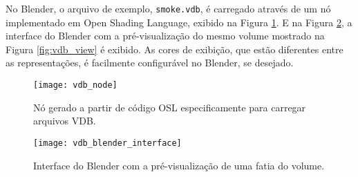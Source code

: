 No Blender, o arquivo de exemplo, \texttt{smoke.vdb}, é carregado através de um nó implementado em Open Shading Language, exibido na Figura \ref{vdb_node}. E na Figura \ref{vdb_blender_interface}, a interface do Blender com a pré-visualização do mesmo volume mostrado na Figura \ref{fig:vdb_view} é exibido. As cores de exibição, que estão diferentes entre as representações, é facilmente configurável no Blender, se desejado.
\iffalse
	Opening file: /Users/rafael/Documents/vdb_files/smoke.vdb
VDB file loaded. Volume details: 

creator: Houdini/SOP_OpenVDB_Write
Grid name: density
Grid value type: float
 class: fog volume
 file_bbox_max: [111, 223, 112]
 file_bbox_min: [1, 2, 1]
 file_mem_bytes: 6.984.656
 				10.793.640
 file_voxel_count: 1049275
 is_local_space: false
 is_saved_as_half_float: true
 name: density
 roiMax: [112, 224, 113]
 roiMin: [0, 0, 0]
 value_type: float
 vector_type: invariant
\fi
\begin{figure}[!htb]
\center
\texttt{[image: vdb\_node]}
\caption{Nó gerado a partir de código OSL especificamente para carregar arquivos VDB.}
\label{vdb_node}
\end{figure}

\begin{figure}[!htb]
\center
\texttt{[image: vdb\_blender\_interface]}
\caption{Interface do Blender com a pré-visualização de uma fatia do volume.}
\label{vdb_blender_interface}
\end{figure}